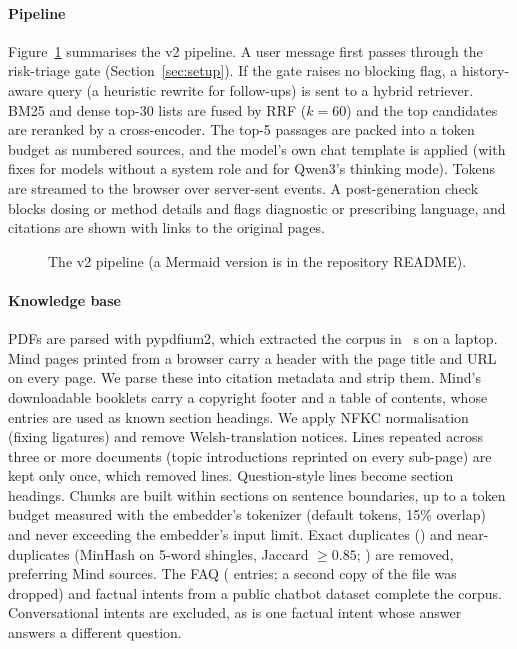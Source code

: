 \documentclass[preprint,12pt,authoryear]{elsarticle}
\begin{document}
\paragraph{Pipeline} Figure~\ref{fig:arch} summarises the v2 pipeline. A user message first passes through the
risk-triage gate (Section~\ref{sec:setup}). If the gate raises no blocking flag, a history-aware query (a heuristic
rewrite for follow-ups) is sent to a hybrid retriever. BM25 and dense top-30 lists are fused by RRF ($k=60$) and the
top candidates are reranked by a cross-encoder. The top-5 passages are packed into a token budget as numbered sources,
and the model's own chat template is applied (with fixes for models without a system role and for Qwen3's thinking
mode). Tokens are streamed to the browser over server-sent events. A post-generation check blocks dosing or method
details and flags diagnostic or prescribing language, and citations are shown with links to the original pages.

\begin{figure}[t]
\centering
{}
\caption{The v2 pipeline (a Mermaid version is in the repository README).}
\label{fig:arch}
\end{figure}

\paragraph{Knowledge base} PDFs are parsed with pypdfium2, which extracted the corpus in \PdfExtractSeconds{}~s on a
laptop. Mind pages printed from a browser carry a header with the page title and URL on every page. We parse these
into citation metadata and strip them. Mind's downloadable booklets carry a copyright footer and a table of contents,
whose entries are used as known section headings. We apply NFKC normalisation (fixing ligatures) and remove Welsh-translation
notices. Lines repeated across three or more documents (topic introductions reprinted on every sub-page) are kept only
once, which removed \NBoilerplateLines{} lines. Question-style lines become section headings. Chunks are built within
sections on sentence boundaries, up to a token budget measured with the embedder's tokenizer (default
\ChunkTokens{} tokens, 15\% overlap) and never exceeding the embedder's input limit. Exact duplicates
(\NExactDups{}) and near-duplicates (MinHash on 5-word shingles, Jaccard $\geq 0.85$; \NNearDups{}) are removed,
preferring Mind sources. The FAQ (\NFAQ{} entries; a second copy of the file was dropped) and \NKBFactsIndexed{}
factual intents from a public chatbot dataset complete the corpus. Conversational intents are excluded, as is one
factual intent whose answer answers a different question.
\end{document}
